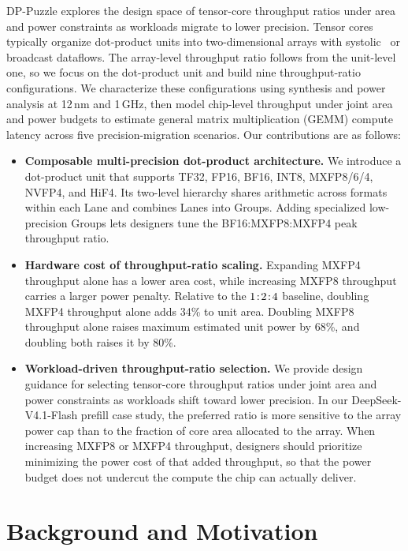 \documentclass[conference,10pt,letterpaper]{IEEEtran}
\DeclareRobustCommand{\tpratio}[3]{\ensuremath{#1\mkern2mu{:}\mkern2mu#2\mkern2mu{:}\mkern2mu#3}}
\begin{document}
DP-Puzzle explores the design space of tensor-core throughput ratios under area and power constraints as workloads migrate to lower precision. Tensor cores typically organize dot-product units into two-dimensional arrays with systolic~\cite{jouppi2017tpu} or broadcast dataflows. The array-level throughput ratio follows from the unit-level one, so we focus on the dot-product unit and build nine throughput-ratio configurations. We characterize these configurations using synthesis and power analysis at 12\,nm and 1\,GHz, then model chip-level throughput under joint area and power budgets to estimate general matrix multiplication (GEMM) compute latency across five precision-migration scenarios.
Our contributions are as follows:
\begin{itemize}
\item \textbf{Composable multi-precision dot-product architecture.} We introduce a dot-product unit that supports TF32, FP16, BF16, INT8, MXFP8/6/4, NVFP4, and HiF4. Its two-level hierarchy shares arithmetic across formats within each Lane and combines Lanes into Groups. Adding specialized low-precision Groups lets designers tune the BF16:MXFP8:MXFP4 peak throughput ratio.
\item \textbf{Hardware cost of throughput-ratio scaling.} Expanding MXFP4 throughput alone has a lower area cost, while increasing MXFP8 throughput carries a larger power penalty. Relative to the \tpratio{1}{2}{4} baseline, doubling MXFP4 throughput alone adds 34\% to unit area. Doubling MXFP8 throughput alone raises maximum estimated unit power by 68\%, and doubling both raises it by 80\%.
\item \textbf{Workload-driven throughput-ratio selection.} We provide design guidance for selecting tensor-core throughput ratios under joint area and power constraints as workloads shift toward lower precision. In our DeepSeek-V4.1-Flash prefill case study, the preferred ratio is more sensitive to the array power cap than to the fraction of core area allocated to the array. When increasing MXFP8 or MXFP4 throughput, designers should prioritize minimizing the power cost of that added throughput, so that the power budget does not undercut the compute the chip can actually deliver. 
\end{itemize}


\section{Background and Motivation}
\label{sec:background}
\end{document}
